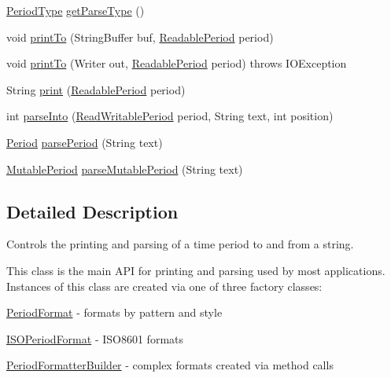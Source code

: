 \begin{DoxyCompactItemize}
\item 
\hyperlink{classorg_1_1joda_1_1time_1_1_period_type}{Period\-Type} \hyperlink{classorg_1_1joda_1_1time_1_1format_1_1_period_formatter_a35bf4305000472294e4aa801efb54dd1}{get\-Parse\-Type} ()
\item 
void \hyperlink{classorg_1_1joda_1_1time_1_1format_1_1_period_formatter_a775a14cc118fb4573dcf0c48b773c736}{print\-To} (String\-Buffer buf, \hyperlink{interfaceorg_1_1joda_1_1time_1_1_readable_period}{Readable\-Period} period)
\item 
void \hyperlink{classorg_1_1joda_1_1time_1_1format_1_1_period_formatter_a8e642b16d93cc5992530bd4135fcba0a}{print\-To} (Writer out, \hyperlink{interfaceorg_1_1joda_1_1time_1_1_readable_period}{Readable\-Period} period)  throws I\-O\-Exception 
\item 
String \hyperlink{classorg_1_1joda_1_1time_1_1format_1_1_period_formatter_ad74eb3eeed48e02651f24c6151ea2239}{print} (\hyperlink{interfaceorg_1_1joda_1_1time_1_1_readable_period}{Readable\-Period} period)
\item 
int \hyperlink{classorg_1_1joda_1_1time_1_1format_1_1_period_formatter_aa24e43ebb5021aea787bd0472e603bc1}{parse\-Into} (\hyperlink{interfaceorg_1_1joda_1_1time_1_1_read_writable_period}{Read\-Writable\-Period} period, String text, int position)
\item 
\hyperlink{classorg_1_1joda_1_1time_1_1_period}{Period} \hyperlink{classorg_1_1joda_1_1time_1_1format_1_1_period_formatter_a198f018c06b4ed565df92f6adc815e09}{parse\-Period} (String text)
\item 
\hyperlink{classorg_1_1joda_1_1time_1_1_mutable_period}{Mutable\-Period} \hyperlink{classorg_1_1joda_1_1time_1_1format_1_1_period_formatter_a14bd6f5d008dfb9aea269080c649d442}{parse\-Mutable\-Period} (String text)
\end{DoxyCompactItemize}


\subsection{Detailed Description}
Controls the printing and parsing of a time period to and from a string. 

This class is the main A\-P\-I for printing and parsing used by most applications. Instances of this class are created via one of three factory classes\-: 
\begin{DoxyItemize}
\item \hyperlink{classorg_1_1joda_1_1time_1_1format_1_1_period_format}{Period\-Format} -\/ formats by pattern and style 
\item \hyperlink{classorg_1_1joda_1_1time_1_1format_1_1_i_s_o_period_format}{I\-S\-O\-Period\-Format} -\/ I\-S\-O8601 formats 
\item \hyperlink{classorg_1_1joda_1_1time_1_1format_1_1_period_formatter_builder}{Period\-Formatter\-Builder} -\/ complex formats created via method calls 
\end{DoxyItemize}

